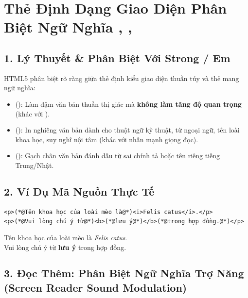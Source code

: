 \section{Thẻ Định Dạng Giao Diện Phân Biệt Ngữ Nghĩa , , }
\subsection{1. Lý Thuyết \& Phân Biệt Với Strong / Em}
HTML5 phân biệt rõ ràng giữa thẻ định kiểu giao diện thuần túy và thẻ mang ngữ nghĩa:
\begin{itemize}
    \item {} (): Làm đậm văn bản thuần thị giác mà \textbf{không làm tăng độ quan trọng} (khác với ).
    \item {} (): In nghiêng văn bản dành cho thuật ngữ kỹ thuật, từ ngoại ngữ, tên loài khoa học, suy nghĩ nội tâm (khác với  nhấn mạnh giọng đọc).
    \item {} (): Gạch chân văn bản đánh dấu từ sai chính tả hoặc tên riêng tiếng Trung/Nhật.
\end{itemize}

\subsection{2. Ví Dụ Mã Nguồn Thực Tế}
\begin{codeWindow}
\begin{lstlisting}[language=HTML5]
<p>(*@Tên khoa học của loài mèo là@*)<i>Felis catus</i>.</p>
<p>(*@Vui lòng chú ý từ@*)<b>(*@lưu ý@*)</b>(*@trong hợp đồng.@*)</p>
\end{lstlisting}
\end{codeWindow}

\begin{browserWindow}
\sffamily\small
Tên khoa học của loài mèo là \textit{Felis catus}.\\[4pt]
Vui lòng chú ý từ \textbf{lưu ý} trong hợp đồng.
\end{browserWindow}

\subsection{3. Đọc Thêm: Phân Biệt Ngữ Nghĩa Trợ Năng (Screen Reader Sound Modulation)}

